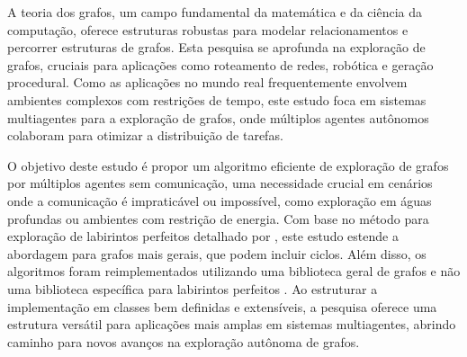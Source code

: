 A teoria dos grafos,
um campo fundamental da matemática e da ciência da computação,
oferece estruturas robustas para modelar relacionamentos e percorrer estruturas de grafos.
Esta pesquisa se aprofunda na exploração de grafos,
cruciais para aplicações como roteamento de redes,
robótica e geração procedural.
Como as aplicações no mundo real frequentemente envolvem ambientes complexos com restrições de tempo,
este estudo foca em sistemas multiagentes para a exploração de grafos,
onde múltiplos agentes autônomos colaboram para otimizar a distribuição de tarefas.

O objetivo deste estudo é propor um algoritmo eficiente de exploração de grafos por múltiplos agentes sem comunicação,
uma necessidade crucial em cenários onde a comunicação é impraticável ou impossível,
como exploração em águas profundas ou ambientes com restrição de energia.
Com base no método para exploração de labirintos perfeitos detalhado por ,
este estudo estende a abordagem para grafos mais gerais, que podem incluir ciclos.
Além disso, os algoritmos foram reimplementados utilizando uma biblioteca geral de grafos e não uma biblioteca 
específica para labirintos perfeitos \cite{Naeem2021}. Ao estruturar a implementação em classes bem definidas e extensíveis,
a pesquisa oferece uma estrutura versátil para aplicações mais amplas em sistemas multiagentes,
abrindo caminho para novos avanços na exploração autônoma de grafos.

